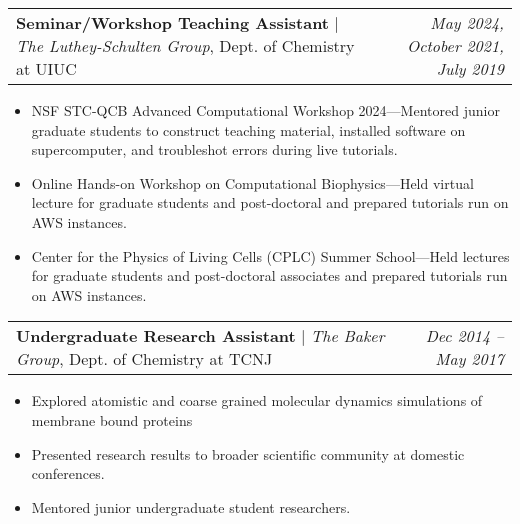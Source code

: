 \documentclass[letterpaper,10pt]{article}
\makeatletter
\newcommand{\experienceitemvspace}{3pt}
\newcommand{\resumeItem}[1]{
  \item{
    {#1 \vspace{-4pt}}
  }
}
\newcommand{\titleItem}[1]{
  \textbf{#1}
}
\newcommand{\resumeProjectHeading}[2]{
    \item
    \begin{tabular*}{0.97\textwidth}{l@{\extracolsep{\fill}}r}
      #1 & \textit{ #2} \\
    \end{tabular*}\vspace{-9pt}
}
\newcommand{\resumeItemListStart}{
\begin{itemize}}
\newcommand{\resumeItemListEnd}{
\end{itemize}\vspace{-8pt}}
\makeatother
\begin{document}

\vspace{\experienceitemvspace}
\resumeProjectHeading
{\titleItem{{Seminar/Workshop Teaching Assistant}} $|$ \emph{The Luthey-Schulten Group}, Dept. of Chemistry at UIUC}{\textcolor{color2}{May 2024, October 2021, July 2019}}
\vspace{2pt}
\resumeItemListStart
\resumeItem{NSF STC-QCB Advanced Computational Workshop 2024---Mentored junior graduate students to construct teaching material, installed software on supercomputer, and troubleshot errors during live tutorials.}
\resumeItem{Online Hands-on Workshop on Computational Biophysics---Held virtual lecture for graduate students and post-doctoral and prepared tutorials run on AWS instances.}
\resumeItem{Center for the Physics of Living Cells (CPLC) Summer School---Held lectures for graduate students and post-doctoral associates and prepared tutorials run on AWS instances.}
\resumeItemListEnd


\vspace{\experienceitemvspace}
\resumeProjectHeading
{\titleItem{{Undergraduate Research Assistant}} $|$ \emph{The Baker Group}, Dept. of Chemistry at TCNJ}{\textcolor{color2}{Dec 2014 -- May 2017}}
\vspace{2pt}
\resumeItemListStart
\resumeItem{Explored atomistic and coarse grained molecular dynamics simulations of membrane bound proteins}
\resumeItem{Presented research results to broader scientific community at domestic conferences.}
\resumeItem{Mentored junior undergraduate student researchers.}
\resumeItemListEnd
\end{document}
